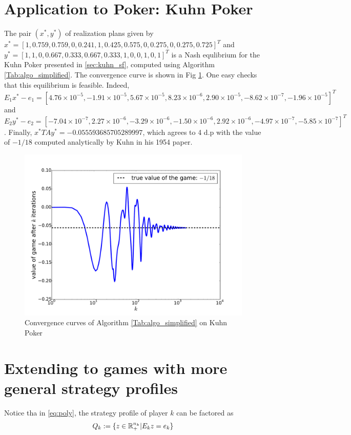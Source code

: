 \documentclass{article} %
\begin{document}
\section{Application to Poker: Kuhn Poker}
\label{sec:kuhn}
The pair $(x^*, y^*)$ of realization plans given by\\
$x^* = [1, 0.759, 0.759, 0, 0.241, 1, 0.425, 0.575, 0, 0.275, 0, 0.275, 0.725]^T$ and
$y^* = [1, 1, 0, 0.667, 0.333, 0.667, 0.333, 1, 0, 0, 1, 0, 1]^T$ is a Nash equlibrium for the Kuhn Poker presented in \ref{sec:kuhn_sf}, computed using Algorithm  \ref{Tab:algo_simplified}. The convergence curve is shown in Fig \ref{Tab:conv_curves}. One easy checks that this equilibrium is feasible. Indeed,  $E_1x^* - e_1 = [4.76 \times 10^{-5}, -1.91 \times 10^{-5}, 5.67 \times 10^{-5}, 8.23 \times 10^{-6}, 2.90 \times 10^{-5}, -8.62 \times 10^{-7}, -1.96 \times 10^{-5}]^T$ and $E_2y^* - e_2 = [-7.04 \times 10^{-7}, 2.27 \times 10^{-6}, -3.29 \times 10^{-6}, -1.50 \times 10^{-6}, 2.92 \times 10^{-6}, -4.97 \times 10^{-7}, -5.85 \times 10^{-7}]^T$. Finally, $x^*TAy^* = -0.055593685705289997$, which agrees to 4 d.p with the value of $-1 / 18$ computed analytically by Kuhn in his 1954 paper.

\begin{figure}
  \includegraphics[width=1\linewidth]{Kuhn3112_NE.pdf}
  \caption{Convergence curves of Algorithm \ref{Tab:algo_simplified} on Kuhn Poker}
  \label{Tab:conv_curves}
\end{figure}

\section{Extending to games with more general strategy profiles}
\label{sec:algo_gen}
Notice tha in \eqref{eq:poly}, the strategy profile of player $k$ can be factored as
\begin{equation}
  Q_k := \{z \in \mathbb{R}^{n_k}_+| E_kz = e_k\text\}
\end{equation}
\end{document}
